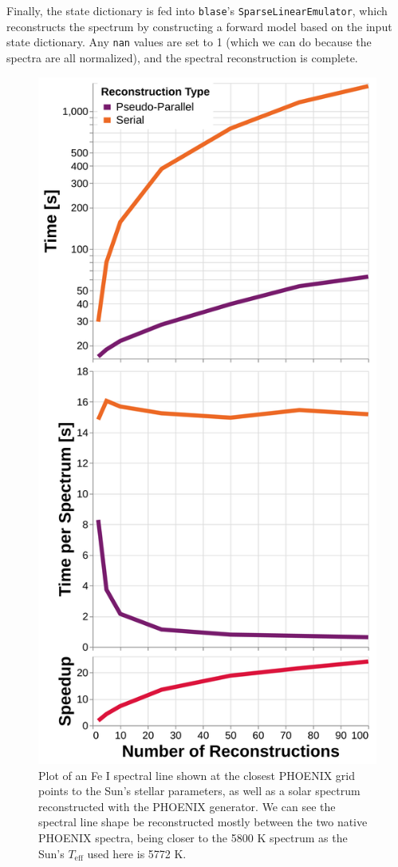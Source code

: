 \documentclass[twocolumn]{aastex631}
\begin{document}
Finally, the state dictionary is fed into \texttt{blase}'s \texttt{SparseLinearEmulator}, which reconstructs the spectrum by constructing a forward model based on the input state dictionary. 
Any \texttt{nan} values are set to 1 (which we can do because the spectra are all normalized), and the spectral reconstruction is complete.
\begin{figure}
    \centering
    \includegraphics[width=\textwidth]{figure7}
    \caption{Plot of an Fe I spectral line shown at the closest PHOENIX grid points to the Sun's stellar parameters, as well as a solar spectrum reconstructed with the PHOENIX generator.
    We can see the spectral line shape be reconstructed mostly between the two native PHOENIX spectra, being closer to the 5800 K spectrum as the Sun's $T_{\mathrm{eff}}$ used here is 5772 K.}
    \label{fig:figure7}
\end{figure}
\end{document}
